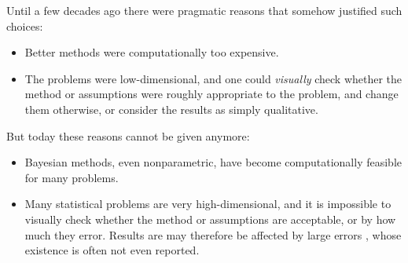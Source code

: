 \documentclass{article}
\begin{document}
Until a few decades ago there were pragmatic reasons that somehow justified such choices:
\begin{itemize}
\item Better methods were computationally too expensive.
\item The problems were low-dimensional, and one could \emph{visually} check whether the method or assumptions were roughly appropriate to the problem, and change them otherwise, or consider the results as simply qualitative.
\end{itemize}

But today these reasons cannot be given anymore:
\begin{itemize}
\item Bayesian methods, even nonparametric, have become computationally feasible for many problems.
\item Many statistical problems are very high-dimensional, and it is impossible to visually check whether the method or assumptions are acceptable, or by how much they error. Results are may therefore be affected by large errors \citep{draper1995}, whose existence is often not even reported.
\end{itemize}




\citep{walker2010}



\end{document}
